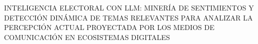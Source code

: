\begin{center}
	\vspace*{10cm}
	{INTELIGENCIA ELECTORAL CON LLM: MINERÍA DE SENTIMIENTOS Y DETECCIÓN DINÁMICA DE TEMAS RELEVANTES PARA ANALIZAR LA PERCEPCIÓN ACTUAL PROYECTADA POR LOS MEDIOS DE COMUNICACIÓN EN ECOSISTEMAS DIGITALES}
\end{center}
